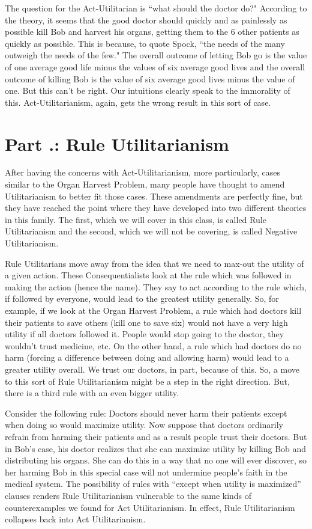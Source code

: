 The question for the Act-Utilitarian is ``what should the doctor do?" According to the theory, it seems that the good doctor should quickly and as painlessly as possible kill Bob and harvest his organs, getting them to the 6 other patients as quickly as possible. This is because, to quote Spock, ``the needs of the many outweigh the needs of the few." The overall outcome of letting Bob go is the value of one average good life minus the values of six average good lives and the overall outcome of killing Bob is the value of six average good lives minus the value of one. But this can't be right. Our intuitions clearly speak to the immorality of this.  Act-Utilitarianism, again, gets the wrong result in this sort of case. 

\section{Part \thechapcount.\theseccount: Rule Utilitarianism}

After having the concerns with Act-Utilitarianism, more particularly, cases similar to the Organ Harvest Problem, many people have thought to amend Utilitarianism to better fit those cases. These amendments are perfectly fine, but they have reached the point where they have developed into two different theories in this family. The first, which we will cover in this class, is called Rule Utilitarianism and the second, which we will not be covering, is called Negative Utilitarianism.

Rule Utilitarians move away from the idea that we need to max-out the utility of a given action. These Consequentialists look at the rule which was followed in making the action (hence the name). They say to act according to the rule which, if followed by everyone, would lead to the greatest utility generally. So, for example, if we look at the Organ Harvest Problem, a rule which had doctors kill their patients to save others (kill one to save six) would not have a very high utility if all doctors followed it. People would stop going to the doctor, they wouldn't trust medicine, etc. On the other hand, a rule which had doctors do no harm (forcing a difference between doing and allowing harm) would lead to a greater utility overall. We trust our doctors, in part, because of this. So, a move to this sort of Rule Utilitarianism might be a step in the right direction. But, there is a third rule with an even bigger utility.

Consider the following rule: Doctors should never harm their patients except when doing so would maximize utility. Now suppose that doctors ordinarily refrain from harming their patients and as a result people trust their doctors. But in Bob’s case, his doctor realizes that she can maximize utility by killing Bob and distributing his organs. She can do this in a way that no one will ever discover, so her harming Bob in this special case will not undermine people’s faith in the medical system. The possibility of rules with “except when utility is maximized” clauses renders Rule Utilitarianism vulnerable to the same kinds of counterexamples we found for Act Utilitarianism. In effect, Rule Utilitarianism collapses back into Act Utilitarianism.

